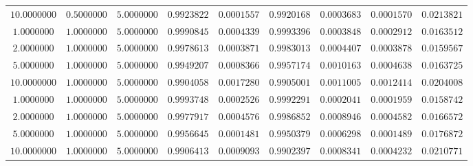\begin{tabular}{ccccccccc}
$10.0000000$ & $0.5000000$ & $5.0000000$ & $0.9923822$ & $0.0001557$ & $0.9920168$ & $0.0003683$ & $0.0001570$ & $0.0213821$\\
$1.0000000$ & $1.0000000$ & $5.0000000$ & $0.9990845$ & $0.0004339$ & $0.9993396$ & $0.0003848$ & $0.0002912$ & $0.0163512$\\
$2.0000000$ & $1.0000000$ & $5.0000000$ & $0.9978613$ & $0.0003871$ & $0.9983013$ & $0.0004407$ & $0.0003878$ & $0.0159567$\\
$5.0000000$ & $1.0000000$ & $5.0000000$ & $0.9949207$ & $0.0008366$ & $0.9957174$ & $0.0010163$ & $0.0004638$ & $0.0163725$\\
$10.0000000$ & $1.0000000$ & $5.0000000$ & $0.9904058$ & $0.0017280$ & $0.9905001$ & $0.0011005$ & $0.0012414$ & $0.0204008$\\
$1.0000000$ & $1.0000000$ & $5.0000000$ & $0.9993748$ & $0.0002526$ & $0.9992291$ & $0.0002041$ & $0.0001959$ & $0.0158742$\\
$2.0000000$ & $1.0000000$ & $5.0000000$ & $0.9977917$ & $0.0004576$ & $0.9986852$ & $0.0008946$ & $0.0004582$ & $0.0166572$\\
$5.0000000$ & $1.0000000$ & $5.0000000$ & $0.9956645$ & $0.0001481$ & $0.9950379$ & $0.0006298$ & $0.0001489$ & $0.0176872$\\
$10.0000000$ & $1.0000000$ & $5.0000000$ & $0.9906413$ & $0.0009093$ & $0.9902397$ & $0.0008341$ & $0.0004232$ & $0.0210771$\\
\end{tabular}
